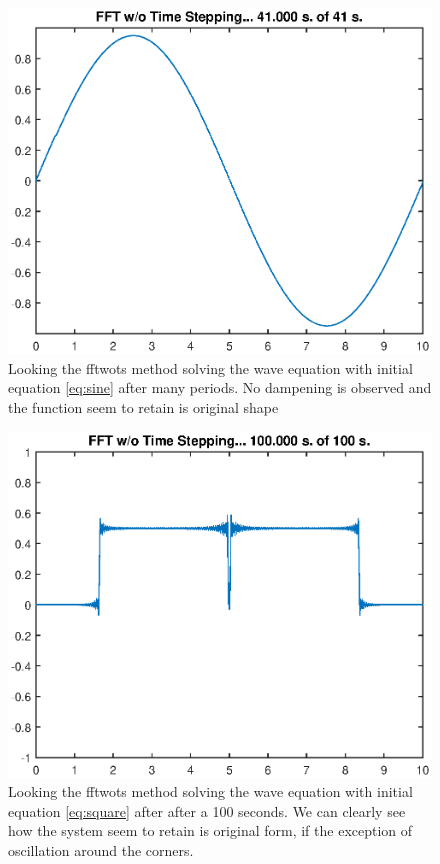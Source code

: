\documentclass[11pt]{article}
\begin{document}
\begin{figure}[H]
	\centering
	\includegraphics[width=1\textwidth]{../fftwotsSine}
	\caption{Looking the fftwots method solving the wave equation with initial equation 
	\ref{eq:sine} after many periods. No dampening is observed and the function seem to retain is original shape}
	\label{fig:fftwotsSine}
\end{figure}
\begin{figure}[H]
	\centering
	\includegraphics[width=1\textwidth]{../fftwotsSquare}
	\caption{Looking the fftwots method solving the wave equation with initial equation 
	\ref{eq:square} after after a 100 seconds. We can clearly see how the system seem to retain is original form, if the exception of oscillation around the corners.}
	\label{fig:fftwotsSquare}
\end{figure}
\end{document}
